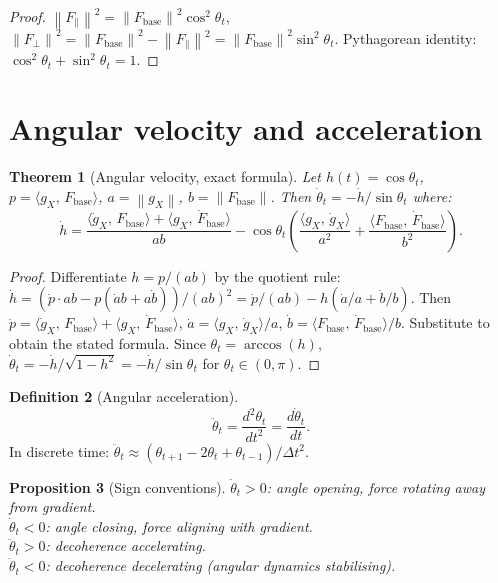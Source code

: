 \documentclass[11pt,a4paper,openany]{book}
\newtheorem{theorem}{Theorem}[chapter]
\newtheorem{proposition}[theorem]{Proposition}
\theoremstyle{definition}
\newtheorem{definition}[theorem]{Definition}
\newcommand{\norm}[1]{\left\|#1\right\|}
\newcommand{\inner}[2]{\langle #1,\,#2\rangle}
\newcommand{\Fbase}{F_{\mathrm{base}}}
\newcommand{\gX}{g_X}
\begin{document}
\begin{proof}
$\norm{F_\parallel}^2 = \norm{\Fbase}^2\cos^2\theta_t$, $\norm{F_\perp}^2 = \norm{\Fbase}^2 - \norm{F_\parallel}^2 = \norm{\Fbase}^2\sin^2\theta_t$. Pythagorean identity: $\cos^2\theta_t + \sin^2\theta_t = 1$.
\end{proof}

\section{Angular velocity and acceleration}

\begin{theorem}[Angular velocity, exact formula]
\label{thm:angvel}
Let $h(t) = \cos\theta_t$, $p = \inner{\gX}{\Fbase}$, $a = \norm{\gX}$, $b = \norm{\Fbase}$.
Then $\dot\theta_t = -\dot h / \sin\theta_t$ where:
\[
\dot h = \frac{\inner{\dot\gX}{\Fbase} + \inner{\gX}{\dot\Fbase}}{ab}
- \cos\theta_t\!\left(\frac{\inner{\gX}{\dot\gX}}{a^2} + \frac{\inner{\Fbase}{\dot\Fbase}}{b^2}\right).
\]
\end{theorem}

\begin{proof}
Differentiate $h = p/(ab)$ by the quotient rule:
$\dot h = (\dot p \cdot ab - p(\dot a b + a\dot b))/(ab)^2 = \dot p/(ab) - h(\dot a/a + \dot b/b)$.
Then $\dot p = \inner{\dot\gX}{\Fbase} + \inner{\gX}{\dot\Fbase}$,
$\dot a = \inner{\gX}{\dot\gX}/a$, $\dot b = \inner{\Fbase}{\dot\Fbase}/b$.
Substitute to obtain the stated formula. Since $\theta_t = \arccos(h)$,
$\dot\theta_t = -\dot h/\sqrt{1-h^2} = -\dot h/\sin\theta_t$ for $\theta_t \in (0,\pi)$.
\end{proof}

\begin{definition}[Angular acceleration]
\[
\ddot\theta_t = \frac{d^2\theta_t}{dt^2} = \frac{d\dot\theta_t}{dt}.
\]
In discrete time: $\ddot\theta_t \approx (\theta_{t+1} - 2\theta_t + \theta_{t-1})/\Delta t^2$.
\end{definition}

\begin{proposition}[Sign conventions]
$\dot\theta_t > 0$: angle opening, force rotating away from gradient.\\
$\dot\theta_t < 0$: angle closing, force aligning with gradient.\\
$\ddot\theta_t > 0$: decoherence accelerating.\\
$\ddot\theta_t < 0$: decoherence decelerating (angular dynamics stabilising).
\end{proposition}
\end{document}
